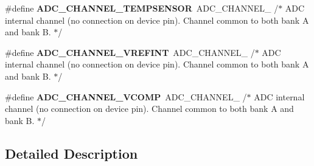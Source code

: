 \begin{DoxyCompactItemize}
\item 
\hypertarget{group___a_d_c__channels_ga8f0da1e8fa8504c92a368f6eb8e229b3}{\#define {\bfseries A\-D\-C\-\_\-\-C\-H\-A\-N\-N\-E\-L\-\_\-\-T\-E\-M\-P\-S\-E\-N\-S\-O\-R}~A\-D\-C\-\_\-\-C\-H\-A\-N\-N\-E\-L\-\_  /$\ast$ A\-D\-C internal channel (no connection on device pin). Channel common to both bank A and bank B. $\ast$/}\label{group___a_d_c__channels_ga8f0da1e8fa8504c92a368f6eb8e229b3}

\item 
\hypertarget{group___a_d_c__channels_ga2647a044275a295693e8fb01db3172f9}{\#define {\bfseries A\-D\-C\-\_\-\-C\-H\-A\-N\-N\-E\-L\-\_\-\-V\-R\-E\-F\-I\-N\-T}~A\-D\-C\-\_\-\-C\-H\-A\-N\-N\-E\-L\-\_  /$\ast$ A\-D\-C internal channel (no connection on device pin). Channel common to both bank A and bank B. $\ast$/}\label{group___a_d_c__channels_ga2647a044275a295693e8fb01db3172f9}

\item 
\hypertarget{group___a_d_c__channels_ga0b441db15bbb081faa2f43c07f81b170}{\#define {\bfseries A\-D\-C\-\_\-\-C\-H\-A\-N\-N\-E\-L\-\_\-\-V\-C\-O\-M\-P}~A\-D\-C\-\_\-\-C\-H\-A\-N\-N\-E\-L\-\_  /$\ast$ A\-D\-C internal channel (no connection on device pin). Channel common to both bank A and bank B. $\ast$/}\label{group___a_d_c__channels_ga0b441db15bbb081faa2f43c07f81b170}

\end{DoxyCompactItemize}


\subsection{Detailed Description}
